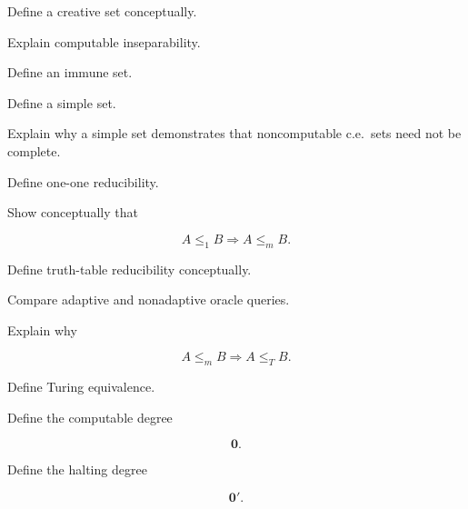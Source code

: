 \begin{exercise}[3]
Define a creative set conceptually.
\end{exercise}

\begin{exercise}[3]
Explain computable inseparability.
\end{exercise}

\begin{exercise}[3]
Define an immune set.
\end{exercise}

\begin{exercise}[3]
Define a simple set.
\end{exercise}

\begin{exercise}[3]
Explain why a simple set demonstrates that noncomputable c.e.\ sets need not
be complete.
\end{exercise}

\begin{exercise}[2]
Define one-one reducibility.
\end{exercise}

\begin{exercise}[3]
Show conceptually that

\[
A\leq_1B
\Longrightarrow
A\leq_mB.
\]
\end{exercise}

\begin{exercise}[2]
Define truth-table reducibility conceptually.
\end{exercise}

\begin{exercise}[3]
Compare adaptive and nonadaptive oracle queries.
\end{exercise}

\begin{exercise}[3]
Explain why

\[
A\leq_mB
\Longrightarrow
A\leq_TB.
\]
\end{exercise}

\begin{exercise}[2]
Define Turing equivalence.
\end{exercise}

\begin{exercise}[2]
Define the computable degree

\[
\mathbf{0}.
\]
\end{exercise}

\begin{exercise}[2]
Define the halting degree

\[
\mathbf{0}'.
\]
\end{exercise}

